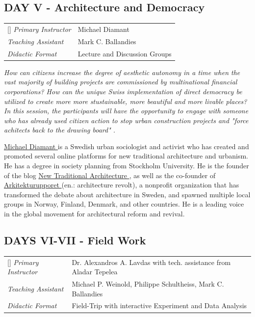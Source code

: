 \documentclass{article}
\begin{document}
\subsection{DAY V - Architecture and Democracy}

\begin{NiceTabular}{W{l}{3cm}l}[]
\textit{Primary Instructor} & Michael Diamant \\
\textit{Teaching Assistant} & Mark C. Ballandies \\
\textit{Didactic Format} & Lecture and Discussion Groups
\end{NiceTabular}

\textit{How can citizens increase the degree of aesthetic autonomy in a time when the vast majority of building projects are commissioned by multinational financial corporations? How can the unique Swiss implementation of direct democracy be utilized to create more more stustainable, more beautiful and more livable places? In this session, the participants will have the opportunity to engage with someone who has already used citizen action to stop urban construction projects and "force achitects back to the drawing board" \cite{natalia_michael_2021}.}

\href{https://newtrad.org/aboutme/}{Michael Diamant \ExternalLink} is a Swedish urban sociologist and activist who has created and promoted several online platforms for new traditional architecture and urbanism. He has a degree in society planning from Stockholm University. He is the founder of the blog \href{https://newtrad.org/}{New Traditional Architecture \ExternalLink}, as well as the co-founder of \href{https://www.arkitekturupproret.se}{Arkitekturupporet \ExternalLink} (en.: architecture revolt), a nonprofit organization that has  transformed the debate about architecture in Sweden, and spawned multiple local groups in Norway, Finland, Denmark, and other countries. He is a leading voice in the global movement for architectural reform and revival.

\subsection{DAYS VI-VII - Field Work}

\begin{NiceTabular}{W{l}{3cm}l}[]
\textit{Primary Instructor} & Dr. Alexandros A. Lavdas with tech. assistance from Aladar Tepelea \\
\textit{Teaching Assistant} & Michael P. Weinold, Philippe Schultheiss, Mark C. Ballandies \\
\textit{Didactic Format} & Field-Trip with interactive Experiment and Data Analysis
\end{NiceTabular}
\end{document}
